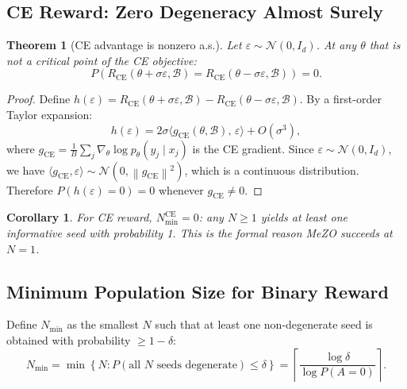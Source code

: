 \documentclass[11pt]{article}
\newtheorem{theorem}{Theorem}
\newtheorem{corollary}{Corollary}
\theoremstyle{definition}
\theoremstyle{remark}
\newcommand{\norm}[1]{\left\|#1\right\|}
\newcommand{\Nmin}{N_{\mathrm{min}}}
\begin{document}
\subsection{CE Reward: Zero Degeneracy Almost Surely}

\begin{theorem}[CE advantage is nonzero a.s.]
\label{thm:ce-nondegeneracy}
Let $\varepsilon \sim \mathcal{N}(0, I_d)$. At any $\theta$ that is not a critical point of the CE objective:
\begin{equation}
  P\!\left(R_{\mathrm{CE}}(\theta + \sigma\varepsilon, \mathcal{B}) = R_{\mathrm{CE}}(\theta - \sigma\varepsilon, \mathcal{B})\right) = 0.
\end{equation}
\end{theorem}

\begin{proof}
Define $h(\varepsilon) = R_{\mathrm{CE}}(\theta+\sigma\varepsilon, \mathcal{B}) - R_{\mathrm{CE}}(\theta-\sigma\varepsilon, \mathcal{B})$. By a first-order Taylor expansion:
\[
  h(\varepsilon) = 2\sigma\langle g_{\mathrm{CE}}(\theta, \mathcal{B}),\, \varepsilon \rangle + O(\sigma^3),
\]
where $g_{\mathrm{CE}} = \frac{1}{B}\sum_j \nabla_\theta \log p_\theta(y_j \mid x_j)$ is the CE gradient. Since $\varepsilon \sim \mathcal{N}(0, I_d)$, we have $\langle g_{\mathrm{CE}}, \varepsilon\rangle \sim \mathcal{N}(0, \norm{g_{\mathrm{CE}}}^2)$, which is a continuous distribution. Therefore $P(h(\varepsilon) = 0) = 0$ whenever $g_{\mathrm{CE}} \neq 0$.
\end{proof}

\begin{corollary}
For CE reward, $\Nmin^{\mathrm{CE}} = 0$: any $N \geq 1$ yields at least one informative seed with probability 1. This is the formal reason MeZO succeeds at $N=1$.
\end{corollary}

\subsection{Minimum Population Size for Binary Reward}

Define $\Nmin$ as the smallest $N$ such that at least one non-degenerate seed is obtained with probability $\geq 1-\delta$:
\begin{equation}
  \Nmin = \min\left\{N : P(\text{all } N \text{ seeds degenerate}) \leq \delta\right\} = \left\lceil \frac{\log\delta}{\log P(A=0)} \right\rceil.
  \label{eq:nmin}
\end{equation}
\end{document}
